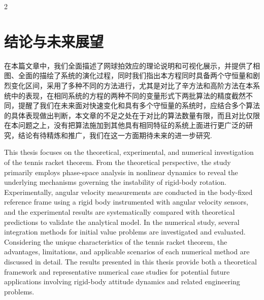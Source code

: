 \documentclass{CLGPY}
\begin{document}
\begin{multicols}{2}
	\section{结论与未来展望}
	在本篇文章中，我们全面描述了网球拍效应的理论说明和可视化展示，并提供了相图、全面的描绘了系统的演化过程，同时我们指出本方程同时具备两个守恒量和剧烈变化区间，采用了多种不同的方法进行，尤其是对比了辛方法和高阶方法在本系统中的表现，在相同系统的方程的两种不同的变量形式下两批算法的精度截然不同，提醒了我们在未来面对快速变化和具有多个守恒量的系统时，应结合多个算法的具体表现做出判断，本文章的不足之处在于对比的算法数量有限，而且对比仅限在本问题之上，没有把算法施加到其他具有相同特征的系统上面进行更广泛的研究，结论有待精炼和推广，我们在这一方面期待未来的进一步研究.
	
		
       		\nocite{*}%
        

    \end{multicols}%

\newpage
\Maketitle
\begin{enabstract}
    This thesis focuses on the theoretical, experimental, and numerical investigation of the tennis racket theorem. From the theoretical perspective, the study primarily employs phase-space analysis in nonlinear dynamics to reveal the underlying mechanisms governing the instability of rigid-body rotation. Experimentally, angular velocity measurements are conducted in the body-fixed reference frame using a rigid body instrumented with angular velocity sensors, and the experimental results are systematically compared with theoretical predictions to validate the analytical model. In the numerical study, several integration methods for initial value problems are investigated and evaluated. Considering the unique characteristics of the tennis racket theorem, the advantages, limitations, and applicable scenarios of each numerical method are discussed in detail. The results presented in this thesis provide both a theoretical framework and representative numerical case studies for potential future applications involving rigid-body attitude dynamics and related engineering problems.
\end{enabstract}
\end{document}
